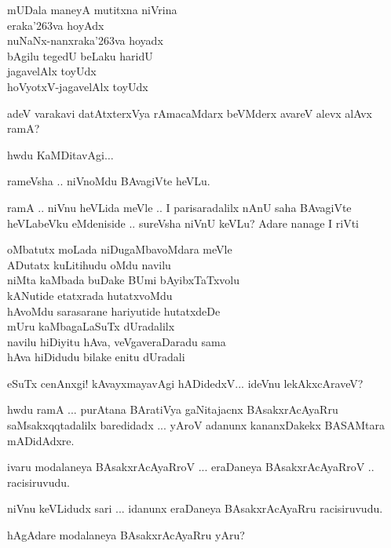 \begin{description}
  \itemsep=1pt
\item[rameVsha:] mUDala maneyA mutitxna niVrina\\
eraka\char'263va hoyAdx\\
nuNaNx-nanxraka\char'263va hoyadx\\
bAgilu tegedU beLaku haridU\\
jagavelAlx toyUdx\\
hoVyotxV-jagavelAlx toyUdx

\item[rameVsha:] adeV varakavi datAtxterxVya rAmacaMdarx beVMderx avareV alevx alAvx ramA?

\item[ramA:] hwdu KaMDitavAgi$\ldots$

rameVsha .. niVnoMdu BAvagiVte heVLu.

\item[rameVsha:] ramA .. niVnu heVLida meVle .. I parisaradalilx nAnU saha BAvagiVte heVLabeVku eMdeniside .. sureVsha niVnU keVLu? Adare nanage I riVti 

\smallskip
oMbatutx moLada niDugaMbavoMdara meVle\\
ADutatx kuLitihudu oMdu navilu\\
niMta kaMbada buDake BUmi bAyibxTaTxvolu\\
kANutide etatxrada hutatxvoMdu\\
hAvoMdu sarasarane hariyutide hutatxdeDe\\
mUru kaMbagaLaSuTx dUradalilx\\
navilu hiDiyitu hAva, veVgaveraDaradu sama\\
hAva hiDidudu bilake enitu dUradali
\smallskip

\item[ramA:] eSuTx cenAnxgi! kAvayxmayavAgi hADidedxV... ideVnu lekAkxcAraveV?

\item[sureVsha:] hwdu ramA ... purAtana BAratiVya gaNitajacnx BAsakxrAcAyaRru saMsakxqqtadalilx baredidadx ... yAroV adanunx kananxDakekx BASAMtara mADidAdxre.

\item[rameVsha:] ivaru modalaneya BAsakxrAcAyaRroV ... eraDaneya BAsakxrAcAyaRroV .. racisiruvudu.

\item[sureVsha:] niVnu keVLidudx sari ... idanunx eraDaneya BAsakxrAcAyaRru racisiruvudu.

\item[ramA:] hAgAdare modalaneya BAsakxrAcAyaRru yAru?


\end{description}
